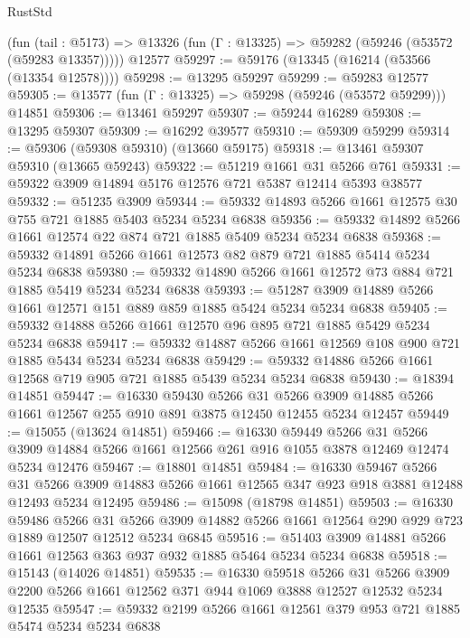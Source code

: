 \begin{lexlean}{RustStd}
\begin{coremodule}
    (fun (tail : @5173) => @13326 (fun (Γ : @13325) => @59282 (@59246 (@53572 (@59283 @13357)))))
    @12577
@59297 := @59176 (@13345 (@16214 (@53566 (@13354 @12578))))
@59298 := @13295 @59297
@59299 := @59283 @12577
@59305 := @13577 (fun (Γ : @13325) => @59298 (@59246 (@53572 @59299))) @14851
@59306 := @13461 @59297
@59307 := @59244 @16289
@59308 := @13295 @59307
@59309 := @16292 @39577
@59310 := @59309 @59299
@59314 := @59306 (@59308 @59310) (@13660 @59175)
@59318 := @13461 @59307 @59310 (@13665 @59243)
@59322 := @51219 @1661 @31 @5266 @761
@59331 := @59322 @3909 @14894 @5176 @12576 @721 @5387 @12414 @5393 @38577
@59332 := @51235 @3909
@59344 := @59332 @14893 @5266 @1661 @12575 @30 @755 @721 @1885 @5403 @5234 @5234 @6838
@59356 := @59332 @14892 @5266 @1661 @12574 @22 @874 @721 @1885 @5409 @5234 @5234 @6838
@59368 := @59332 @14891 @5266 @1661 @12573 @82 @879 @721 @1885 @5414 @5234 @5234 @6838
@59380 := @59332 @14890 @5266 @1661 @12572 @73 @884 @721 @1885 @5419 @5234 @5234 @6838
@59393 := @51287 @3909 @14889 @5266 @1661 @12571 @151 @889 @859 @1885 @5424 @5234 @5234 @6838
@59405 := @59332 @14888 @5266 @1661 @12570 @96 @895 @721 @1885 @5429 @5234 @5234 @6838
@59417 := @59332 @14887 @5266 @1661 @12569 @108 @900 @721 @1885 @5434 @5234 @5234 @6838
@59429 := @59332 @14886 @5266 @1661 @12568 @719 @905 @721 @1885 @5439 @5234 @5234 @6838
@59430 := @18394 @14851
@59447 := @16330
    @59430
    @5266
    @31
    @5266
    @3909
    @14885
    @5266
    @1661
    @12567
    @255
    @910
    @891
    @3875
    @12450
    @12455
    @5234
    @12457
@59449 := @15055 (@13624 @14851)
@59466 := @16330
    @59449
    @5266
    @31
    @5266
    @3909
    @14884
    @5266
    @1661
    @12566
    @261
    @916
    @1055
    @3878
    @12469
    @12474
    @5234
    @12476
@59467 := @18801 @14851
@59484 := @16330
    @59467
    @5266
    @31
    @5266
    @3909
    @14883
    @5266
    @1661
    @12565
    @347
    @923
    @918
    @3881
    @12488
    @12493
    @5234
    @12495
@59486 := @15098 (@18798 @14851)
@59503 := @16330
    @59486
    @5266
    @31
    @5266
    @3909
    @14882
    @5266
    @1661
    @12564
    @290
    @929
    @723
    @1889
    @12507
    @12512
    @5234
    @6845
@59516 := @51403 @3909 @14881 @5266 @1661 @12563 @363 @937 @932 @1885 @5464 @5234 @5234 @6838
@59518 := @15143 (@14026 @14851)
@59535 := @16330
    @59518
    @5266
    @31
    @5266
    @3909
    @2200
    @5266
    @1661
    @12562
    @371
    @944
    @1069
    @3888
    @12527
    @12532
    @5234
    @12535
@59547 := @59332 @2199 @5266 @1661 @12561 @379 @953 @721 @1885 @5474 @5234 @5234 @6838

\end{coremodule}
\end{lexlean}
